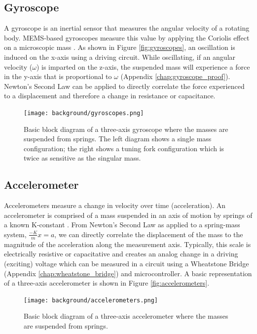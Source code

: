 \subsection{Gyroscope} 
A gyroscope is an inertial sensor that measures the angular velocity of a rotating body.
MEMS-based gyroscopes measure this value by applying the Coriolis effect on a microscopic mass \cite{Corke:2011}.
As shown in Figure \ref{fig:gyroscopes}, an oscillation is induced on the x-axis using a driving circuit.
While oscillating, if an angular velocity ($\omega$) is imparted on the z-axis, the suspended mass will experience a force in the y-axis that is proportional to $\omega$ (Appendix \ref{chap:gyroscope_proof}).
Newton's Second Law can be applied to directly correlate the force experienced to a displacement and therefore a change in resistance or capacitance.

\begin{figure}[h!]
    \caption[Gyroscope block diagram]{Basic block diagram of a three-axis gyroscope where the masses are suspended from springs. The left diagram shows a single mass configuration; the right shows a tuning fork configuration which is twice as sensitive as the singular mass.}
    \centering
    \texttt{[image: background/gyroscopes.png]}
\end{figure}

\subsection{Accelerometer} 
Accelerometers measure a change in velocity over time (acceleration).
An accelerometer is comprised of a mass suspended in an axis of motion by springs of a known K-constant \cite{Corke:2011}.
From Newton's Second Law as applied to a spring-mass system, $\frac{-K}{m}x=a$, we can directly correlate the displacement of the mass to the magnitude of the acceleration along the measurement axis.
Typically, this scale is electrically resistive or capacitative and creates an analog change in a driving (exciting) voltage which can be measured in a circuit using a Wheatstone Bridge (Appendix \ref{chap:wheatstone_bridge}) and microcontroller.
A basic representation of a three-axis accelerometer is shown in Figure \ref{fig:accelerometers}.

\begin{figure}[h!]
    \caption[Accelerometer block diagram]{Basic block diagram of a three-axis accelerometer where the masses are suspended from springs.}
    \centering
    \texttt{[image: background/accelerometers.png]}
\end{figure}

